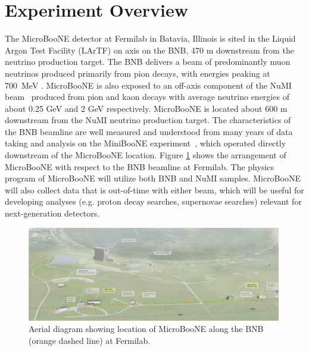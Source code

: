 \section{Experiment Overview}
\label{sec:overview}

The MicroBooNE detector at Fermilab in Batavia, Illinois is sited in the Liquid Argon Test Facility (LArTF) on axis on the BNB, 470 m downstream from the neutrino production target.   The BNB delivers a beam of predominantly muon neutrinos produced primarily from pion decays, with energies peaking at 700~MeV \cite{AguilarArevalo:2008yp}. MicroBooNE is also exposed to an off-axis component of the NuMI beam~\cite{Adamson:2015dkw} produced from pion and kaon decays with average neutrino energies of about 0.25 GeV and 2 GeV respectively.   MicroBooNE is located about 600 m downstream from the NuMI neutrino production target.  The characteristics of the BNB beamline are well measured and understood from many years of data taking and analysis on the MiniBooNE experiment~\cite{AguilarArevalo:2008yp}, which operated directly downstream of the MicroBooNE location.  Figure \ref{fnalmap} shows the arrangement of MicroBooNE with respect to the BNB beamline at Fermilab.  The physics program of MicroBooNE will utilize both BNB and NuMI samples.  MicroBooNE will also collect data that is out-of-time with either beam, which will be useful for developing analyses (e.g. proton decay searches, supernovae searches) relevant for next-generation detectors.  


\begin{figure}
\centering 
\includegraphics[width=0.99\textwidth]{figures/aerial_diagram.jpg}
\caption{Aerial diagram showing location of MicroBooNE along the BNB (orange dashed line) at Fermilab.}
\label{fnalmap}
\end{figure}


